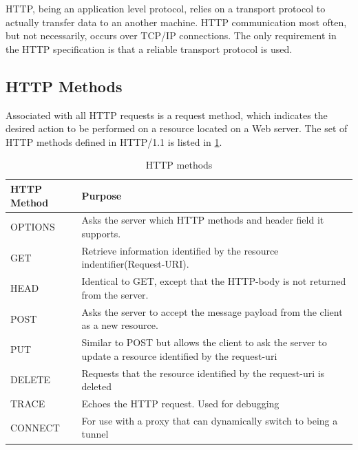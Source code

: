 HTTP, being an application level protocol, relies on a transport protocol to
actually transfer data to an another machine. HTTP communication most often, but
not necessarily, occurs over TCP/IP connections. The only requirement in the HTTP
specification is that a reliable transport protocol is used.

\subsection{HTTP Methods}

 Associated with all HTTP requests is a request method, which indicates the
 desired action to be performed on a resource located on a Web server. The set
 of HTTP methods defined in HTTP/1.1 is listed in \cref{table-http-methods}.

 \begin{table}[h]
 \begin{tabularx}{\textwidth}{| X | X |}
 \hline
   \textbf{HTTP Method} & \textbf{Purpose} \\ \hline
   OPTIONS & Asks the server which HTTP methods and header field it supports. \\ \hline
   GET & Retrieve information identified by the resource indentifier(Request-URI). \\ \hline
   HEAD & Identical to GET, except that the HTTP-body is not returned from the server. \\ \hline
   POST & Asks the server to accept the message payload from the client as a new resource.\\ \hline
   PUT & Similar to POST but allows the client to ask the server to update a resource identified by the request-uri \\ \hline
   DELETE & Requests that the resource identified by the request-uri is deleted \\ \hline
   TRACE & Echoes the HTTP request. Used for debugging \\ \hline
   CONNECT & For use with a proxy that can dynamically switch to being a tunnel\\ \hline
 \end{tabularx}
 \caption{HTTP methods}
 \label{table-http-methods}
 \end{table}

\section{}
\label{tcp}

